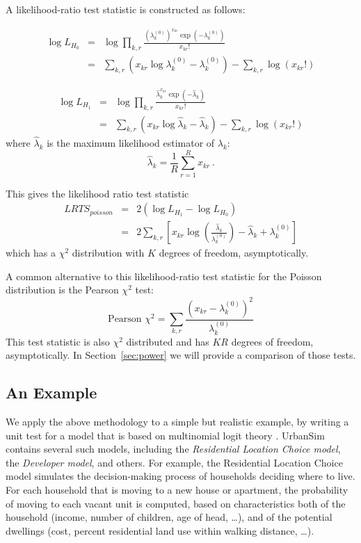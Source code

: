 \documentclass{sig-alternate-preprint}
\begin{document}
A likelihood-ratio test statistic is constructed as follows:

\begin{eqnarray*}
\log L_{H_0}& =& \log \prod_{k,r} \frac{(\lambda_k^{(0)})^{x_{kr}}
    \exp(-\lambda_k^{(0)})}{x_{kr}!} \\
 &= &\sum_{k,r} (x_{kr}\log \lambda_k^{(0)}
    - \lambda_k^{(0)}) - \sum_{k,r} \log (x_{kr}!)
\end{eqnarray*}


 \begin{eqnarray*}
\log L_{H_1} &= &\log \prod_{k,r} \frac{\hat{\lambda}_{k}^{x_{kr}}
    \exp(-\hat{\lambda}_{k})}{x_{kr}!} \\
&= &\sum_{k,r} (x_{kr}\log \hat{\lambda}_{k}
    - \hat{\lambda}_{k}) - \sum_{k,r} \log (x_{kr}!)
\end{eqnarray*}
where $\hat{\lambda}_{k}$ is the maximum likelihood estimator of $\lambda_{k}$:
\[
\hat{\lambda}_{k} = \frac{1}{R}\sum_{r=1}^R x_{kr}\,.
\]

This gives the likelihood ratio test statistic
\begin{eqnarray*}
LRTS_{poisson}  & = & 2(\log L_{H_1} - \log L_{H_0}) \\
&= &2 \sum_{k,r} \left[ x_{kr} \log
\left(\frac{\hat{\lambda}_{k}}{\lambda_k^{(0)}}\right) - \hat{\lambda}_{k} + \lambda_k^{(0)} \right]
\end{eqnarray*}
which has a $\chi^2$ distribution with $K$
degrees of freedom, asymptotically.

A common alternative to this likelihood-ratio test statistic for the Poisson
distribution is the Pearson $\chi^2$ test:
\[
\text{Pearson } \chi^2 = \sum_{k,r} \frac{(x_{kr} - \lambda_k^{(0)})^2}{\lambda_k^{(0)}}
\]
This test statistic is also $\chi^2$ distributed and has $KR$
degrees of freedom, asymptotically. In Section~\ref{sec:power} we will provide a
comparison of those tests.


\subsection{An Example}
\label{sec:example}

We apply the above methodology to a simple but realistic example, by
writing a unit test for a model that is based on multinomial logit theory
\cite{ben-akiva-lerman-1987,train-book-2003}.  UrbanSim contains several
such models, including the \emph{Residential Location Choice model}, the
\emph{Developer model}, and others.  For example, the Residential Location
Choice model simulates the decision-making process of households deciding
where to live.  For each household that is moving to a new house or
apartment, the probability of moving to each vacant unit is computed, based
on characteristics both of the household (income, number of children, age
of head, \ldots), and of the potential dwellings (cost, percent residential
land use within walking distance, \ldots).
\end{document}
